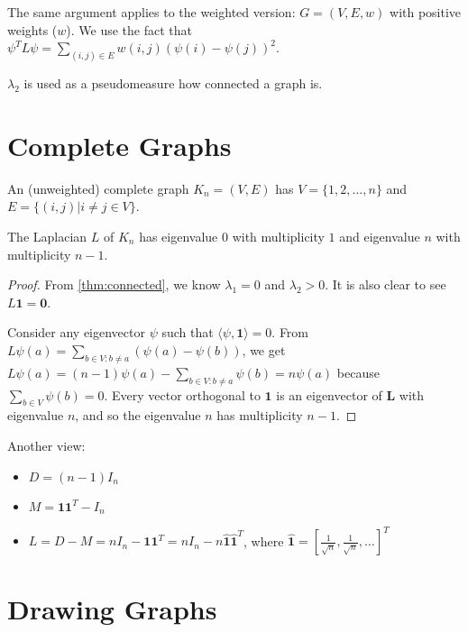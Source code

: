 \documentclass[11pt,letterpaper]{article}
\begin{document}
\begin{remark}
    The same argument applies to the weighted version: $G=(V,E,w)$ with positive weights ($w$).
    We use the fact that $\psi ^T L \psi = \sum_{(i,j)\in E} w(i,j)\left(\psi(i) - \psi(j)\right)^2$.
\end{remark}

\begin{remark}
    $\lambda_2$ is used as a pseudomeasure how connected a graph is.
\end{remark}

\section{Complete Graphs}

An (unweighted) complete graph $K_n = (V,E)$ has
$V=\{1,2,\ldots,n\}$ and $E=\{(i,j) | i \neq j \in V\}$.

\begin{theorem}
    The Laplacian $L$ of $K_n$ has eigenvalue 0 with multiplicity $1$ and eigenvalue $n$ with multiplicity $n-1$.
\end{theorem}

\begin{proof}
    From \cref{thm:connected}, we know $\lambda_1=0$ and $\lambda_2>0$.
    It is also clear to see $L\bm{1}=\bm{0}$.

    Consider any eigenvector $\psi$ such that $\langle \psi, \bm{1} \rangle = 0$.
    From $L\psi(a) = \sum_{b \in V: b\neq a} \left(\psi(a) - \psi(b)\right)$,
    we get $L\psi(a) = (n-1)\psi(a) - \sum_{b\in V: b\neq a}\psi(b)=n \psi(a)$
    because $\sum_{b \in V} \psi(b) = 0$.
    Every vector orthogonal to $\bm{1}$ is an eigenvector of $\bm{L}$ with eigenvalue $n$,
    and so the eigenvalue $n$ has multiplicity $n-1$.
\end{proof}

Another view:
\begin{itemize}
    \item $D = (n-1) I_n$
    \item $M=\bm{1}\bm{1}^T - I_n$
    \item $L=D-M=n I_n - \bm{1}\bm{1}^T = nI_n - n \hat{\bm{1}}\hat{\bm{1}}^T$,
    where $\hat{\bm{1}} = \left[\frac{1}{\sqrt{n}}, \frac{1}{\sqrt{n}}, \ldots \right]^T$
\end{itemize}


\section{Drawing Graphs}
\end{document}

